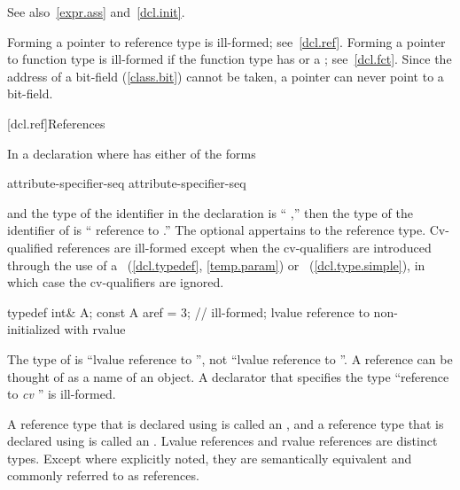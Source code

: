 \pnum
See also~\ref{expr.ass} and~\ref{dcl.init}.

\pnum
\enternote
Forming a pointer to reference type is ill-formed; see~\ref{dcl.ref}.
Forming a pointer to function type is ill-formed if the function type has
 or a ;
see~\ref{dcl.fct}.
Since the address of a bit-field (\ref{class.bit}) cannot be taken,
a pointer can never point to a bit-field.
\exitnote

[dcl.ref]{References}%

\pnum
In a declaration
where
has either of the forms

\begin{ncsimplebnf}
\terminal{\&} attribute-specifier-seq\opt {}\br
\terminal{\&\&} attribute-specifier-seq\opt {}
\end{ncsimplebnf}

and the type of the identifier in the declaration
is ``
,''
then the type of the identifier of
is `` reference to
.''
The optional  appertains to the reference type.
Cv-qualified references are ill-formed except when the cv-qualifiers
are introduced through the use of a
~(\ref{dcl.typedef}, \ref{temp.param}) or
~(\ref{dcl.type.simple}),
in which case the cv-qualifiers are ignored.
\enterexample

\begin{codeblock}
typedef int& A;
const A aref = 3;   // ill-formed; lvalue reference to non- initialized with rvalue
\end{codeblock}

The type of
is ``lvalue reference to '',
not ``lvalue reference to ''.
\exitexample
{}%
\enternote
A reference can be thought of as a name of an object.
\exitnote
A declarator that specifies the type
``reference to \textit{cv} ''
is ill-formed.


\pnum
{}%
%
A reference type that is declared using \tcode{\&} is called an
, and a reference type that
is declared using \tcode{\&\&} is called an
. Lvalue references and
rvalue references are distinct types. Except where explicitly noted, they are
semantically equivalent and commonly referred to as references.

